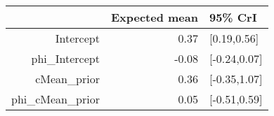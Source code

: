 \begin{tabular}{rrl}
  \hline
 & Expected mean & 95\% CrI \\ 
  \hline
Intercept & 0.37 & [0.19,0.56] \\ 
  phi\_Intercept & -0.08 & [-0.24,0.07] \\ 
  cMean\_prior & 0.36 & [-0.35,1.07] \\ 
  phi\_cMean\_prior & 0.05 & [-0.51,0.59] \\ 
   \hline
\end{tabular}

